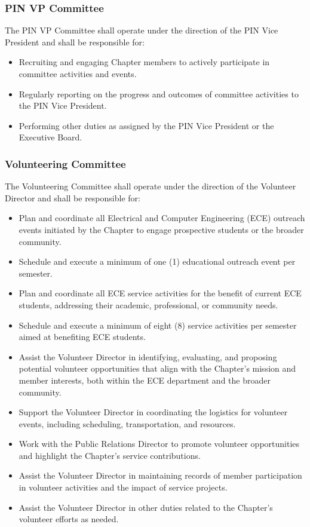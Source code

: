 \documentclass[10pt, oneside]{article}
\begin{document}
\subsubsection{PIN VP Committee}
The PIN VP Committee shall operate under the direction of the PIN Vice President and shall be responsible for:
\begin{itemize}
    \item Recruiting and engaging Chapter members to actively participate in committee activities and events.
    \item Regularly reporting on the progress and outcomes of committee activities to the PIN Vice President.
    \item Performing other duties as assigned by the PIN Vice President or the Executive Board.
\end{itemize}

\subsubsection{Volunteering Committee}
The Volunteering Committee shall operate under the direction of the Volunteer Director and shall be responsible for:
\begin{itemize}
    \item Plan and coordinate all Electrical and Computer Engineering (ECE) outreach events initiated by the Chapter to engage prospective students or the broader community.
    \item Schedule and execute a minimum of one (1) educational outreach event per semester.
    \item Plan and coordinate all ECE service activities for the benefit of current ECE students, addressing their academic, professional, or community needs.
    \item Schedule and execute a minimum of eight (8) service activities per semester aimed at benefiting ECE students.
    \item Assist the Volunteer Director in identifying, evaluating, and proposing potential volunteer opportunities that align with the Chapter's mission and member interests, both within the ECE department and the broader community.
    \item Support the Volunteer Director in coordinating the logistics for volunteer events, including scheduling, transportation, and resources.
    \item Work with the Public Relations Director to promote volunteer opportunities and highlight the Chapter's service contributions.
    \item Assist the Volunteer Director in maintaining records of member participation in volunteer activities and the impact of service projects.
    \item Assist the Volunteer Director in other duties related to the Chapter's volunteer efforts as needed.
\end{itemize}
\end{document}
